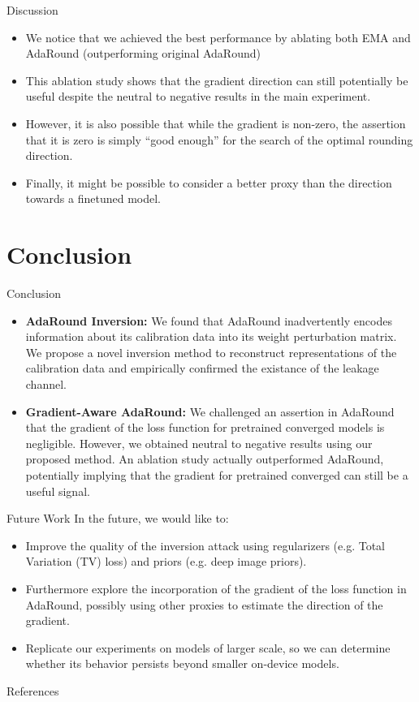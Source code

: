 \documentclass{beamer}
\begin{document}
\begin{frame}{Discussion}
  \begin{itemize}
    \item We notice that we achieved the best performance by ablating both EMA and AdaRound (outperforming original AdaRound)
    \item This ablation study shows that the gradient direction can still potentially be useful despite the neutral to negative results in the main experiment.
    \item However, it is also possible that while the gradient is non-zero, the assertion that it is zero is simply ``good enough'' for the search of the optimal rounding direction.
    \item Finally, it might be possible to consider a better proxy than the direction towards a finetuned model.
  \end{itemize}
\end{frame}

\section{Conclusion}
\begin{frame}{Conclusion}
\begin{itemize}
  \item \textbf{AdaRound Inversion:} We found that AdaRound inadvertently encodes information about its calibration data into its weight perturbation matrix. We propose a novel inversion method to reconstruct representations of the calibration data and empirically confirmed the existance of the leakage channel.
  \item \textbf{Gradient-Aware AdaRound:} We challenged an assertion in AdaRound that the gradient of the loss function for pretrained converged models is negligible. However, we obtained neutral to negative results using our proposed method. An ablation study actually outperformed AdaRound, potentially implying that the gradient for pretrained converged can still be a useful signal.
\end{itemize}
\end{frame}
\begin{frame}{Future Work}
In the future, we would like to:
  \begin{itemize}
    \item Improve the quality of the inversion attack using regularizers (e.g. Total Variation (TV) loss) and priors (e.g. deep image priors). 
    \item Furthermore explore the incorporation of the gradient of the loss function in AdaRound, possibly using other proxies to estimate the direction of the gradient. \item Replicate our experiments on models of larger scale, so we can determine whether its behavior persists beyond smaller on-device models.
  \end{itemize}
\end{frame}

\begin{frame}[t, allowframebreaks]{References}
    \tiny 
\end{frame}
\end{document}
